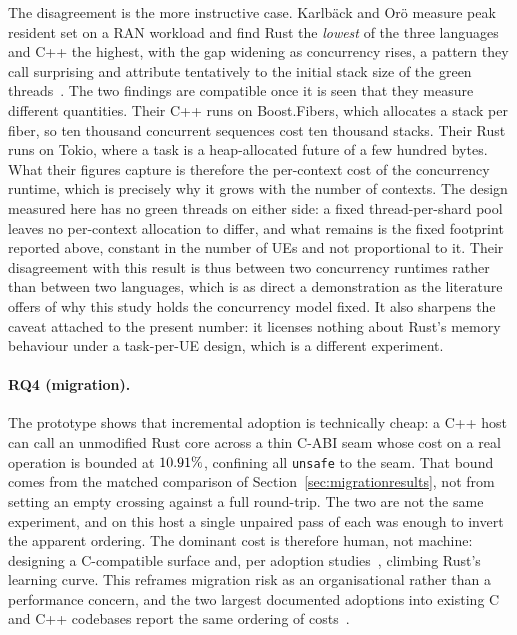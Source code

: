 \documentclass[english,twoside,openright,a4paper,censored,csm,software-track-2020]{HYthesisML}
\begin{document}
The disagreement is the more instructive case. Karlb\"ack and Or\"o measure peak resident set on a RAN workload and
find Rust the \emph{lowest} of the three languages and C++ the highest, with the gap widening
as concurrency rises, a pattern they call surprising and attribute tentatively to the initial
stack size of the green threads~\cite{karlback2021ran}. The two
findings are compatible once it is seen that they measure different quantities. Their C++ runs
on Boost.Fibers, which allocates a stack per fiber, so ten thousand concurrent sequences cost
ten thousand stacks. Their Rust runs on Tokio, where a task is a heap-allocated future of a few
hundred bytes. What their figures capture is therefore the per-context cost of the concurrency
runtime, which is precisely why it grows with the number of contexts. The design measured here
has no green threads on either side: a fixed thread-per-shard pool leaves no per-context
allocation to differ, and what remains is the fixed footprint reported above, constant in the
number of UEs and not proportional to it. Their disagreement with this result is thus
between two concurrency runtimes rather than between two languages, which is as direct a
demonstration as the literature offers of why this study holds the concurrency model fixed. It
also sharpens the caveat attached to the present number: it licenses nothing about Rust's
memory behaviour under a task-per-UE design, which is a different experiment.

\paragraph{RQ4 (migration).} The prototype shows that incremental adoption is technically
cheap: a C++ host can call an unmodified Rust core across a thin C-ABI seam whose cost on a
real operation is bounded at $10.91\%$, confining all \texttt{unsafe} to the seam.
That bound comes from the matched comparison of Section~\ref{sec:migrationresults}, not
from setting an empty crossing
against a full round-trip. The two are not the same experiment, and on this host a single
unpaired pass of each was enough to invert the apparent ordering. The dominant cost is
therefore human, not machine: designing a C-compatible surface and, per adoption
studies~\cite{fulton2021adopting,crichton2024learning}, climbing Rust's learning curve. This
reframes migration risk as an organisational rather than a performance concern, and the two
largest documented adoptions into existing C and C++ codebases report the same ordering of
costs~\cite{li2026rustlinux,fan2026android}.
\end{document}
